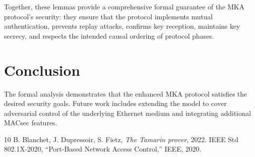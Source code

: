 \documentclass{llncs}
\begin{document}
Together, these lemmas provide a comprehensive formal guarantee of the MKA protocol's security: they ensure that the protocol implements mutual authentication, prevents replay attacks, confirms key reception, maintains key secrecy, and respects the intended causal ordering of protocol phases.

\section{Conclusion}
The formal analysis demonstrates that the enhanced MKA protocol satisfies the desired security goals.  Future work includes extending the model to cover adversarial control of the underlying Ethernet medium and integrating additional MACsec features.


\begin{thebibliography}{10}
  B.  Blanchet, J.  Dupressoir, S.  Fietz, \emph{The Tamarin prover}, 2022.
  IEEE Std 802.1X-2020, “Port‑Based Network Access Control,” IEEE, 2020.
\end{thebibliography}
\end{document}
